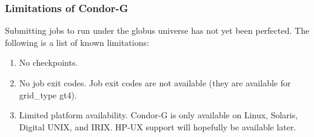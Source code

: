 \subsubsection{\label{sec:Condor-G-Limits}Limitations of Condor-G}
Submitting jobs to run under the globus universe has not yet
been perfected.
The following is a list of known limitations:

\begin{enumerate}
\item{No checkpoints.}
\item{No job exit codes.}
Job exit codes are not available (they are available for grid\_type gt4).
\item{Limited platform availability.}
Condor-G is only available on Linux, Solaris,
Digital UNIX, and IRIX.
HP-UX support will hopefully be available later.
\end{enumerate}



